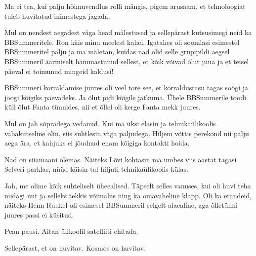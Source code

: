 
Ma ei tea, kui palju hõimuvendlus rolli mängis, pigem arusaam, et tehnoloogiat tuleb huvitatud inimestega jagada. 

Mul on nendest aegadest väga head mälestused ja sellepärast kutsusimegi neid ka BBSummeritele. Ron käis minu meelest kahel. Igatahes oli
soomlasi esimestel BBSummeritel palju ja ma mäletan, kuidas nad olid selle grupipildi aegsel BBSummeril äärmiselt
hämmastunud sellest, et kõik võivad õlut juua ja et teisel päeval ei toimunud mingeid 
kaklusi!

BBSummeri korraldamise juures oli veel tore see, et korraldustasu
tagas söögi ja joogi kõigiks päevadeks. Ja õlut pidi kõigile jätkuma. Ühele BBSummerile toodi küll õlut Fanta tünnides, nii et 
õllel oli kerge Fanta mekk juures.


Mul on jah sõpradega vedanud. Kui ma üksi elasin ja 
tehnikaülikoolis 
vabakutseline olin, siis suhtlesin väga paljudega. 
Hiljem võttis perekond nii palju aega ära, et kahjuks ei jõudnud enam kõigiga 
kontakti hoida.


Nad on siiamaani olemas. Näiteks 
Lõvi kohtasin ma umbes viis aastat tagasi Selveri 
parklas, nüüd käisin tal hiljuti tehnikaülikoolis külas.


Jah, me olime kõik suhteliselt üheealised. Täpselt selles 
vanuses, kui oli huvi teha midagi uut ja selleks tekkis võimalus ning ka omavaheline klapp. Oli ka erandeid, näiteks Henn Ruukel 
oli esimesel BBSummeril selgelt alaealine, aga õlletünni juures passi ei 
küsitud.


Pean pausi. Aitan ülikoolil satelliiti ehitada. 


Sellepärast, et on huvitav. Kosmos on huvitav.


